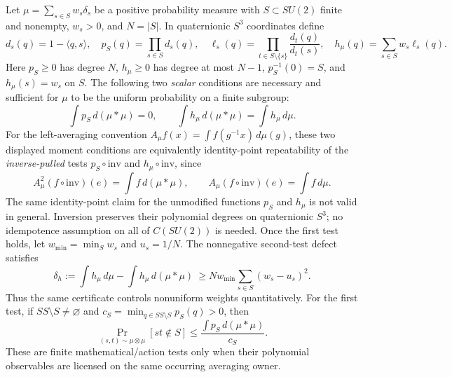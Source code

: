 \documentclass[12pt,a4paper]{article}
\begin{document}
\begin{theorem}
\label{p2a:thm:v274-two-scalar-repeatability-certificate}
Let $\mu=\sum_{s\in S}w_s\delta_s$ be a positive probability
measure with $S\subset SU(2)$ finite and nonempty, $w_s>0$, and
$N=|S|$. In quaternionic $S^3$ coordinates define
\[
 d_s(q)=1-\langle q,s\rangle,\quad
 p_S(q)=\prod_{s\in S}d_s(q),\quad
 \ell_s(q)=\prod_{t\in S\setminus\{s\}}
             \frac{d_t(q)}{d_t(s)},\quad
 h_\mu(q)=\sum_{s\in S}w_s\ell_s(q).
\]
Here $p_S\ge0$ has degree $N$, $h_\mu\ge0$ has degree at most
$N-1$, $p_S^{-1}(0)=S$, and $h_\mu(s)=w_s$ on $S$.
The following two \emph{scalar} conditions are necessary and
sufficient for $\mu$ to be the uniform probability on a finite
subgroup:
\[
 \boxed{\int p_S\,d(\mu*\mu)=0,\qquad
 \int h_\mu\,d(\mu*\mu)=\int h_\mu\,d\mu.}
\]
For the left-averaging convention
$A_\mu f(x)=\int f(g^{-1}x)\,d\mu(g)$, these two displayed
moment conditions are equivalently identity-point repeatability of the
\emph{inverse-pulled} tests $p_S\circ\mathrm{inv}$ and
$h_\mu\circ\mathrm{inv}$, since
\[
 A_\mu^2(f\circ\mathrm{inv})(e)=\int f\,d(\mu*\mu),\qquad
 A_\mu(f\circ\mathrm{inv})(e)=\int f\,d\mu.
\]
The same identity-point claim for the unmodified functions $p_S$ and
$h_\mu$ is not valid in general.  Inversion preserves their polynomial
degrees on quaternionic $S^3$; no idempotence assumption on all of
$C(SU(2))$ is needed.
Once the first test holds, let $w_{\min}=\min_Sw_s$ and
$u_s=1/N$. The nonnegative second-test defect satisfies
\[
 \boxed{\delta_h:=\int h_\mu\,d\mu-
       \int h_\mu\,d(\mu*\mu)
 \ \ge Nw_{\min}\sum_{s\in S}(w_s-u_s)^2.}
\]
Thus the same certificate controls nonuniform weights quantitatively.
For the first test, if $SS\setminus S\ne\varnothing$ and
$c_S=\min_{q\in SS\setminus S}p_S(q)>0$, then
\[
 \Pr_{(s,t)\sim\mu\otimes\mu}[st\notin S]
 \le\frac{\int p_S\,d(\mu*\mu)}{c_S}.
\]
These are finite mathematical/action tests only when their polynomial
observables are licensed on the same occurring averaging owner.
\end{theorem}
\end{document}
